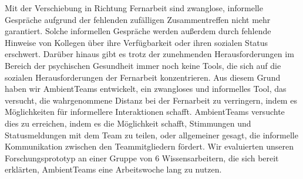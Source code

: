 \documentclass{seal_thesis}
\begin{document}
\begin{zusammenfassung}
    Mit der Verschiebung in Richtung Fernarbeit sind zwanglose, informelle Gespräche aufgrund der fehlenden zufälligen Zusammentreffen nicht mehr garantiert. Solche informellen Gespräche werden außerdem durch fehlende Hinweise von Kollegen über ihre Verfügbarkeit oder ihren sozialen Status erschwert. Darüber hinaus gibt es trotz der zunehmenden Herausforderungen im Bereich der psychischen Gesundheit immer noch keine Tools, die sich auf die sozialen Herausforderungen der Fernarbeit konzentrieren. Aus diesem Grund haben wir AmbientTeams entwickelt, ein zwangloses und informelles Tool, das versucht, die wahrgenommene Distanz bei der Fernarbeit zu verringern, indem es Möglichkeiten für informellere Interaktionen schafft. AmbientTeams versuchte dies zu erreichen, indem es die Möglichkeit schafft, Stimmungen und Statusmeldungen mit dem Team zu teilen, oder allgemeiner gesagt, die informelle Kommunikation zwischen den Teammitgliedern fördert. Wir evaluierten unseren Forschungsprototyp an einer Gruppe von 6 Wissensarbeitern, die sich bereit erklärten, AmbientTeams eine Arbeitswoche lang zu nutzen.
\end{zusammenfassung}

\tableofcontents
\listoffigures
\listoftables

\mainmatter









\begin{appendices}
    
\end{appendices}


\backmatter
\printbibliography
\end{document}
